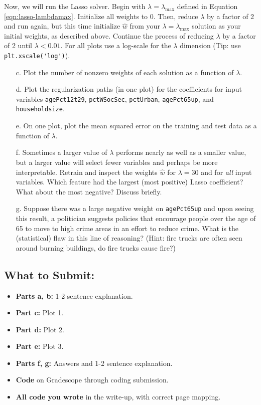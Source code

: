 \documentclass{article}
\begin{document}
\begin{aprob}
    Now, we will run the Lasso solver. Begin with $\lambda = \lambda_{\max}$ defined in Equation \eqref{eqn:lasso-lambdamax}. Initialize all weights to $0$. Then, reduce $\lambda$ by a factor of 2 and run again, but this time initialize $\hat{{w}}$ from your $\lambda = \lambda_{\max}$ solution as your initial weights, as described above. Continue the process of reducing $\lambda$ by a factor of 2 until $\lambda < 0.01$.
    For all plots use a log-scale for the $\lambda$ dimension (Tip: use
    \verb|plt.xscale('log')|).
    \\
    
    
    \begin{enumerate}
        \item[c.]  Plot the number of nonzero weights of each solution as a function of $\lambda$.
        \item[d.]  Plot the regularization paths (in one plot) for the coefficients for input variables \texttt{agePct12t29}, \texttt{pctWSocSec}, \texttt{pctUrban}, \texttt{agePct65up}, and \texttt{householdsize}.
        \item[e.]  On one plot, plot the mean squared error on the training and test data as a function of $\lambda$.
        \item[f.]  Sometimes a larger value of $\lambda$ performs nearly as well as a smaller value, but a larger value will select fewer variables and perhaps be more interpretable.  Retrain and inspect the weights $\hat{w}$ for $\lambda = 30$ and for \textit{all} input variables.  Which feature had the largest (most positive) Lasso coefficient? What about the most negative? Discuss briefly.
        \item[g.]  Suppose there was a large negative weight on \texttt{agePct65up} and upon seeing this result, a politician suggests policies that encourage people over the age of 65 to move to high crime areas in an effort to reduce crime. What is the (statistical) flaw in this line of reasoning? (Hint: fire trucks
        are often seen around burning buildings, do fire trucks cause fire?)
    \end{enumerate}  

    \subsection*{What to Submit:}
    \begin{itemize}
        \item \textbf{Parts a, b:} 1-2 sentence explanation.
        \item \textbf{Part c:} Plot 1.
        \item \textbf{Part d:} Plot 2.
        \item \textbf{Part e:} Plot 3.
        \item \textbf{Parts f, g:} Answers and 1-2 sentence explanation.
        \item \textbf{Code} on Gradescope through coding submission.
        \item \textbf{All code you wrote} in the write-up, with correct page mapping.
    \end{itemize}
\end{aprob}
\end{document}
